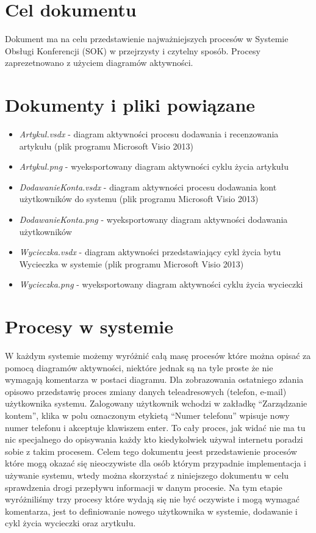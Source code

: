 \section{Cel dokumentu}
\suppressfloats[t]

Dokument ma na celu przedstawienie najważniejszych procesów w Systemie Obsługi Konferencji (SOK) w przejrzysty i czytelny sposób. Procesy zaprezetnowano z użyciem diagramów aktywności.

\section{Dokumenty i pliki powiązane}

\begin{itemize}
  \item \textit{Artykul.vsdx} - diagram aktywności procesu dodawania i recenzowania artykułu (plik programu Microsoft Visio 2013)
  \item \textit{Artykul.png} - wyeksportowany diagram aktywności cyklu życia artykułu
  \item \textit{DodawanieKonta.vsdx} - diagram aktywności procesu dodawania kont użytkowników do systemu (plik programu Microsoft Visio 2013)
  \item \textit{DodawanieKonta.png} - wyeksportowany diagram aktywności dodawania użytkowników
  \item \textit{Wycieczka.vsdx} - diagram aktywności przedstawiający cykl życia bytu Wycieczka w systemie (plik programu Microsoft Visio 2013)
  \item \textit{Wycieczka.png} - wyeksportowany diagram aktywności cyklu życia wycieczki 
\end{itemize}

\section{Procesy w systemie}

W każdym systemie możemy wyróżnić całą masę procesów które można opisać za pomocą diagramów aktywności, niektóre jednak są na tyle proste że nie wymagają komentarza w postaci diagramu. Dla zobrazowania ostatniego zdania opisowo przedstawię proces zmiany danych teleadresowych (telefon, e-mail)  użytkownika systemu. Zalogowany użytkownik wchodzi w zakładkę ``Zarządzanie kontem'', klika w polu oznaczonym etykietą ``Numer telefonu'' wpisuje nowy numer telefonu i akceptuje klawiszem enter. To cały proces, jak widać nie ma tu nic specjalnego do opisywania każdy kto kiedykolwiek używał internetu poradzi sobie z takim procesem. Celem tego dokumentu jeest przedstawienie procesów które mogą okazać się nieoczywiste dla osób którym przypadnie implementacja i używanie systemu, wtedy można skorzystać z niniejszego dokumentu w celu sprawdzenia drogi przepływu informacji w danym procesie. Na tym etapie wyróżniliśmy trzy procesy które wydają się nie być oczywiste i mogą wymagać komentarza, jest to definiowanie nowego użytkownika w systemie, dodawanie i cykl życia wycieczki oraz arytkułu.

